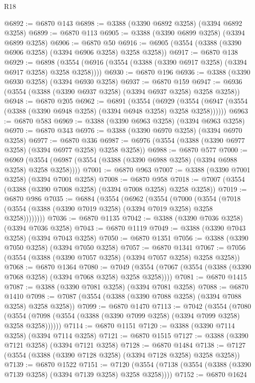 \begin{lexlean}{R18}
\begin{coremodule}
@6892 := @6870 @143
@6898 := @3388 (@3390 @6892 @3258) (@3394 @6892 @3258)
@6899 := @6870 @113
@6905 := @3388 (@3390 @6899 @3258) (@3394 @6899 @3258)
@6906 := @6870 @50
@6916 := @6905 (@3554 (@3388 (@3390 @6906 @3258) (@3394 @6906 @3258) @3258 @3258))
@6917 := @6870 @138
@6929 := @6898 (@3554 (@6916 (@3554 (@3388 (@3390 @6917 @3258) (@3394 @6917 @3258) @3258 @3258))))
@6930 := @6870 @196
@6936 := @3388 (@3390 @6930 @3258) (@3394 @6930 @3258)
@6937 := @6870 @159
@6947 := @6936 (@3554 (@3388 (@3390 @6937 @3258) (@3394 @6937 @3258) @3258 @3258))
@6948 := @6870 @205
@6962 := @6891
    (@3554
      (@6929 (@3554 (@6947 (@3554 (@3388 (@3390 @6948 @3258) (@3394 @6948 @3258) @3258 @3258))))))
@6963 := @6870 @583
@6969 := @3388 (@3390 @6963 @3258) (@3394 @6963 @3258)
@6970 := @6870 @343
@6976 := @3388 (@3390 @6970 @3258) (@3394 @6970 @3258)
@6977 := @6870 @336
@6987 := @6976 (@3554 (@3388 (@3390 @6977 @3258) (@3394 @6977 @3258) @3258 @3258))
@6988 := @6870 @577
@7000 := @6969 (@3554 (@6987 (@3554 (@3388 (@3390 @6988 @3258) (@3394 @6988 @3258) @3258 @3258))))
@7001 := @6870 @963
@7007 := @3388 (@3390 @7001 @3258) (@3394 @7001 @3258)
@7008 := @6870 @958
@7018 := @7007 (@3554 (@3388 (@3390 @7008 @3258) (@3394 @7008 @3258) @3258 @3258))
@7019 := @6870 @986
@7035 := @6884
    (@3554
      (@6962
        (@3554
          (@7000
            (@3554 (@7018 (@3554 (@3388 (@3390 @7019 @3258) (@3394 @7019 @3258) @3258 @3258))))))))
@7036 := @6870 @1135
@7042 := @3388 (@3390 @7036 @3258) (@3394 @7036 @3258)
@7043 := @6870 @1119
@7049 := @3388 (@3390 @7043 @3258) (@3394 @7043 @3258)
@7050 := @6870 @1351
@7056 := @3388 (@3390 @7050 @3258) (@3394 @7050 @3258)
@7057 := @6870 @1341
@7067 := @7056 (@3554 (@3388 (@3390 @7057 @3258) (@3394 @7057 @3258) @3258 @3258))
@7068 := @6870 @1364
@7080 := @7049 (@3554 (@7067 (@3554 (@3388 (@3390 @7068 @3258) (@3394 @7068 @3258) @3258 @3258))))
@7081 := @6870 @1415
@7087 := @3388 (@3390 @7081 @3258) (@3394 @7081 @3258)
@7088 := @6870 @1410
@7098 := @7087 (@3554 (@3388 (@3390 @7088 @3258) (@3394 @7088 @3258) @3258 @3258))
@7099 := @6870 @1470
@7113 := @7042
    (@3554
      (@7080 (@3554 (@7098 (@3554 (@3388 (@3390 @7099 @3258) (@3394 @7099 @3258) @3258 @3258))))))
@7114 := @6870 @1151
@7120 := @3388 (@3390 @7114 @3258) (@3394 @7114 @3258)
@7121 := @6870 @1515
@7127 := @3388 (@3390 @7121 @3258) (@3394 @7121 @3258)
@7128 := @6870 @1484
@7138 := @7127 (@3554 (@3388 (@3390 @7128 @3258) (@3394 @7128 @3258) @3258 @3258))
@7139 := @6870 @1522
@7151 := @7120 (@3554 (@7138 (@3554 (@3388 (@3390 @7139 @3258) (@3394 @7139 @3258) @3258 @3258))))
@7152 := @6870 @1624

\end{coremodule}
\end{lexlean}
